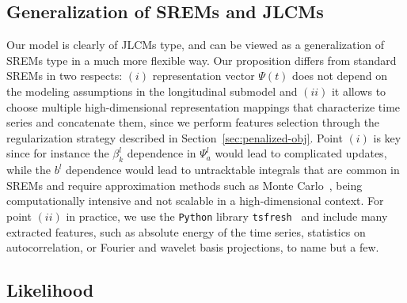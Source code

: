 \documentclass[11pt]{article}
\begin{document}
\subsection{Generalization of SREMs and JLCMs}
 
Our model is clearly of JLCMs type, and can be viewed as a generalization of SREMs type in a much more flexible way. Our proposition differs from standard SREMs in two respects: $(i)$ representation vector $\Psi(t)$ does not depend on the modeling assumptions in the longitudinal submodel and $(ii)$ it allows to choose multiple high-dimensional representation mappings that characterize time series and concatenate them, since we perform features selection through the regularization strategy described in Section~\ref{sec:penalized-obj}. Point $(i)$ is key since for instance the $\beta_k^l$ dependence in $\Psi_a^l$ would lead to complicated updates, while the $b^l$ dependence would lead to untracktable integrals that are common in SREMs and require approximation methods such as Monte Carlo~\citep{hickey2018joinerml}, being computationally intensive and not scalable in a high-dimensional context. For point $(ii)$ in practice, we use the \texttt{Python} library \texttt{tsfresh}~\citep{christ2018time} and include many extracted features, such as absolute energy of the time series, statistics on autocorrelation, or Fourier and wavelet basis projections, to name but a few.

\subsection{Likelihood}
\end{document}
